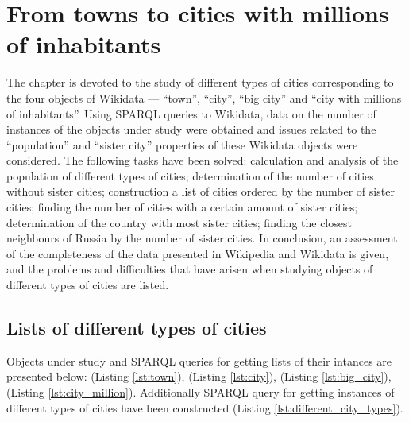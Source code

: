 \setchapterpreamble[u]{\margintoc}
\chapter{From towns to cities with millions of inhabitants\protect\footnotemark}


The chapter is devoted to the study of different types of cities corresponding to the four objects of Wikidata — ``town'', ``city'', ``big city'' and ``city with millions of inhabitants''. Using SPARQL queries to Wikidata, data on the number of instances of the objects under study were obtained and issues related to the ``population'' and ``sister city'' properties of these Wikidata objects were considered. The following tasks have been solved: calculation and analysis of the population of different types of cities; determination of the number of cities without sister cities; construction a list of cities ordered by the number of sister cities; finding the number of cities with a certain amount of sister cities; determination of the country with most sister cities; finding the closest neighbours of Russia by the number of sister cities. In conclusion, an assessment of the completeness of the data presented in Wikipedia and Wikidata is given, and the problems and difficulties that have arisen when studying objects of different types of cities are listed.

\section{Lists of different types of cities}

Objects under study and SPARQL queries for getting lists of their intances are presented below:  (Listing \ref{lst:town}),  (Listing \ref{lst:city}),  (Listing \ref{lst:big_city}),  (Listing \ref{lst:city_million}). Additionally SPARQL query for getting instances of different types of cities have been constructed (Listing \ref{lst:different_city_types}).

